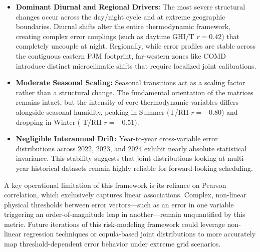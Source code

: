\begin{itemize}
    \item \textbf{Dominant Diurnal and Regional Drivers:} The most severe structural changes occur across the day/night cycle and at extreme geographic boundaries. Diurnal shifts alter the entire thermodynamic framework, creating complex error couplings (such as daytime GHI/T $r= 0.42$) that completely uncouple at night. Regionally, while error profiles are stable across the contiguous eastern PJM footprint, far-western zones like COMD introduce distinct microclimatic shifts that require localized joint calibrations.
    \item \textbf{Moderate Seasonal Scaling:} Seasonal transitions act as a scaling factor rather than a structural change. The fundamental orientation of the matrices remains intact, but the intensity of core thermodynamic variables differs alongside seasonal  humidity, peaking in Summer (T/RH $r = -0.80$) and dropping in Winter ( T/RH $r = -0.51$).
    \item \textbf{Negligible Interannual Drift:} Year-to-year cross-variable error distributions across 2022, 2023, and 2024 exhibit nearly absolute statistical invariance. This stability suggests that joint distributions looking at multi-year historical datasets remain highly reliable for forward-looking scheduling.
\end{itemize}

A key operational limitation of this framework is its reliance on Pearson correlation, which exclusively captures linear associations. Complex, non-linear physical thresholds between error vectors—such as an error in one variable triggering an order-of-magnitude leap in another—remain unquantified by this metric. Future iterations of this risk-modeling framework could leverage non-linear regression techniques or copula-based joint distributions to more accurately map threshold-dependent error behavior under extreme grid scenarios.
